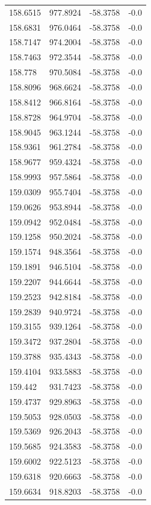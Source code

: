 \begin{table}[H]
\begin{tabular}{llll}
158.6515 & 977.8924 & -58.3758 & -0.0 \\
158.6831 & 976.0464 & -58.3758 & -0.0 \\
158.7147 & 974.2004 & -58.3758 & -0.0 \\
158.7463 & 972.3544 & -58.3758 & -0.0 \\
158.778 & 970.5084 & -58.3758 & -0.0 \\
158.8096 & 968.6624 & -58.3758 & -0.0 \\
158.8412 & 966.8164 & -58.3758 & -0.0 \\
158.8728 & 964.9704 & -58.3758 & -0.0 \\
158.9045 & 963.1244 & -58.3758 & -0.0 \\
158.9361 & 961.2784 & -58.3758 & -0.0 \\
158.9677 & 959.4324 & -58.3758 & -0.0 \\
158.9993 & 957.5864 & -58.3758 & -0.0 \\
159.0309 & 955.7404 & -58.3758 & -0.0 \\
159.0626 & 953.8944 & -58.3758 & -0.0 \\
159.0942 & 952.0484 & -58.3758 & -0.0 \\
159.1258 & 950.2024 & -58.3758 & -0.0 \\
159.1574 & 948.3564 & -58.3758 & -0.0 \\
159.1891 & 946.5104 & -58.3758 & -0.0 \\
159.2207 & 944.6644 & -58.3758 & -0.0 \\
159.2523 & 942.8184 & -58.3758 & -0.0 \\
159.2839 & 940.9724 & -58.3758 & -0.0 \\
159.3155 & 939.1264 & -58.3758 & -0.0 \\
159.3472 & 937.2804 & -58.3758 & -0.0 \\
159.3788 & 935.4343 & -58.3758 & -0.0 \\
159.4104 & 933.5883 & -58.3758 & -0.0 \\
159.442 & 931.7423 & -58.3758 & -0.0 \\
159.4737 & 929.8963 & -58.3758 & -0.0 \\
159.5053 & 928.0503 & -58.3758 & -0.0 \\
159.5369 & 926.2043 & -58.3758 & -0.0 \\
159.5685 & 924.3583 & -58.3758 & -0.0 \\
159.6002 & 922.5123 & -58.3758 & -0.0 \\
159.6318 & 920.6663 & -58.3758 & -0.0 \\
159.6634 & 918.8203 & -58.3758 & -0.0 \\

\end{tabular}
\end{table}
